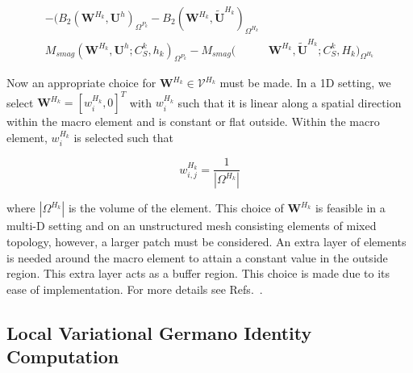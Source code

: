 \begin{equation}
	\label{eq:vgilb}
\begin{split}
-(B_2(\bm{W}^{H_k},\bm{U}^{h})_{\Omega^{P_k}} - B_2(\bm{W}^{H_k},\widetilde{\bm{U}}^{H_k})_{\Omega^{H_k}} \\
 M_{smag}(\bm{W}^{H_k},\bm{U}^{h}; C_S^k, h_k)_{\Omega^{P_k}} - M_{smag}(&\bm{W}^{H_k},\widetilde{\bm{U}}^{H_k} ; C_S^k, H_k)_{\Omega^{H_k}}
\end{split}
\end{equation}

Now an appropriate choice for $\bm{W}^{H_k} \in \bm{\mathcal{V}}^{H_k}$ must be made. 
In a 1D setting, we select
$\bm{W}^{H_k}=[w^{H_k}_i,0]^T$ with $w^{H_k}_i$
such that it is linear along a spatial direction within the
macro element and is constant or flat outside.
Within the macro element, $w^{H_k}_i$ is selected such that

\begin{equation}
\label{eq:wij}
w^{H_k}_{i,j} = \frac{1}{|\Omega^{H_k}|}
\end{equation}

\noindent where $|\Omega^{H_k}|$ is the volume of the
element. 
This choice of $\bm{W}^{H_k}$
is feasible in a multi-D setting and on an
unstructured mesh consisting elements of mixed topology,
however, a larger patch must be considered. An extra layer
of elements is needed around the macro element to attain a constant value
in the outside region. This extra layer acts as a buffer region.
This choice is made due to its ease of implementation.
For more details see Refs.~\cite{bib:tran2017b}.


\subsection{Local Variational Germano Identity Computation}
\label{sec:VGIComp}

